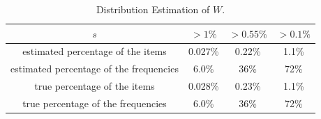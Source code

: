 \documentclass[conference]{IEEEtran}
\begin{document}
\begin{table}
	\caption{Distribution Estimation of $W$.}
	\centering
	\begin{tabular}{|c|c|c|c|}
    \hline
    $s$&$>1\%$&$>0.55\%$&$>0.1\%$\\
    \hline
    estimated percentage of the items&0.027\%&0.22\%&1.1\%\\
    \hline
    estimated percentage of the frequencies&6.0\%&36\%&72\%\\
    \hline
    true percentage of the items&0.028\%&0.23\%&1.1\%\\
    \hline
    true percentage of the frequencies&6.0\%&36\%&72\%\\
    \hline
	\end{tabular}
	\label{tab:distribution}
\end{table}

%
%



%
%
\end{document}
